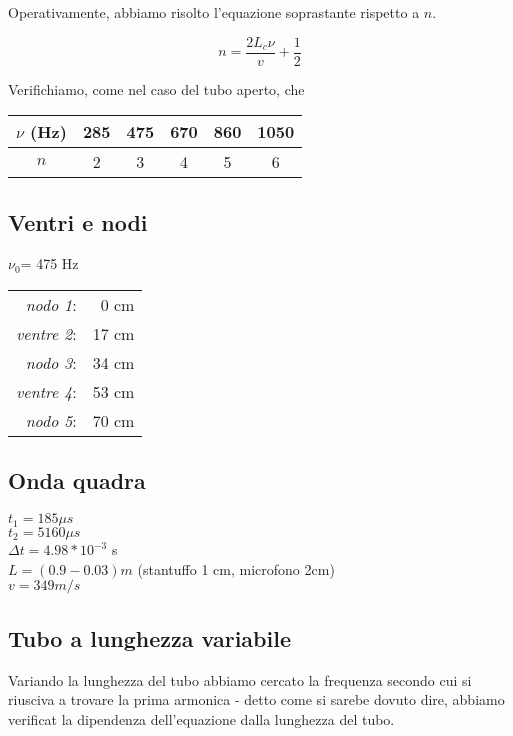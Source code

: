 Operativamente, abbiamo risolto l'equazione soprastante rispetto a $n$.

$$ n = \frac{2L_c\nu}{v} + \frac{1}{2} $$

Verifichiamo, come nel caso del tubo aperto, che 

\begin{center}
\begin{tabular}{c|c|c|c|c|c}
$\nu$ (Hz) & 285 & 475 & 670 & 860 & 1050 \\
\midrule
$n$ & 2 & 3 & 4 & 5 & 6 \\
\end{tabular}
\end{center}

\subsection{Ventri e nodi}
$\nu_0$= 475 Hz\\

\begin{center}
\begin{tabular}{r r}
\textit{nodo 1}: & 0 cm\\
\textit{ventre 2}: & 17 cm\\
\textit{nodo 3}: & 34 cm\\
\textit{ventre 4}: & 53 cm\\
\textit{nodo 5}: & 70 cm\\
\end{tabular}

\end{center}

\subsection{Onda quadra}
$t_1 = 185 \mu s $\\
$t_2 = 5160 \mu s $\\
$\Delta t = 4.98*10^{-3}$ s\\
$L = (0.9 - 0.03) m $ (stantuffo 1 cm, microfono 2cm)\\
$v = 349 m/s$

\subsection{Tubo a lunghezza variabile}
Variando la lunghezza del tubo abbiamo cercato la frequenza secondo cui si riusciva a trovare la prima armonica - detto come si sarebe dovuto dire, abbiamo verificat la dipendenza dell'equazione dalla lunghezza del tubo.

